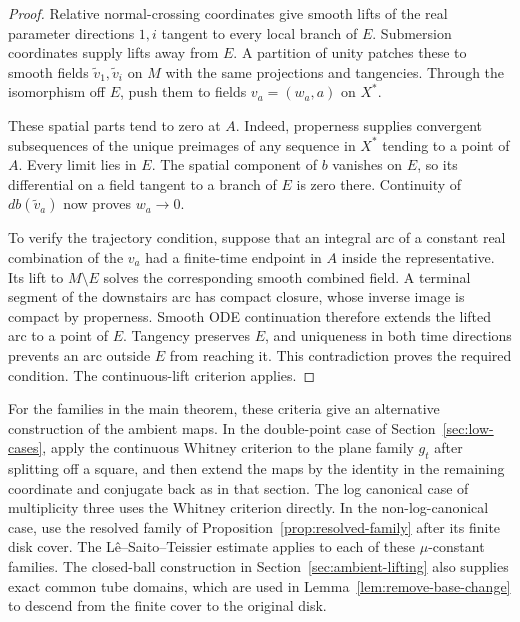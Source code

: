 \begin{proof}
Relative normal-crossing coordinates give smooth lifts of the real
parameter directions $1,i$ tangent to every local branch of $E$.
Submersion coordinates supply lifts away from $E$.  A partition of
unity patches these to smooth fields $\widetilde v_1,\widetilde v_i$
on $M$ with the same projections and tangencies.  Through the
isomorphism off $E$, push them to fields $v_a=(w_a,a)$ on $X^*$.

These spatial parts tend to zero at $A$.  Indeed, properness supplies
convergent subsequences of the unique preimages of any sequence in
$X^*$ tending to a point of $A$.  Every limit lies in $E$.  The
spatial component of $b$ vanishes on $E$, so its differential on a
field tangent to a branch of $E$ is zero there.  Continuity of
$db(\widetilde v_a)$ now proves $w_a\to0$.

To verify the trajectory condition, suppose that an integral arc of
a constant real combination of the $v_a$ had a finite-time endpoint
in $A$ inside the representative.  Its lift to $M\setminus E$
solves the corresponding smooth combined field.  A terminal segment
of the downstairs arc has compact closure, whose inverse image is
compact by properness.  Smooth ODE continuation therefore extends
the lifted arc to a point of $E$.  Tangency preserves $E$, and
uniqueness in both time directions prevents an arc outside $E$ from
reaching it.  This contradiction proves the required condition.
The continuous-lift criterion applies.
\end{proof}

For the families in the main theorem, these criteria give an alternative
construction of the ambient maps.  In the double-point case of
Section~\ref{sec:low-cases}, apply the continuous Whitney criterion to
the plane family $g_t$ after splitting off a square, and then extend
the maps by the identity in the remaining coordinate and conjugate back
as in that section.
The log canonical case of multiplicity three uses the Whitney criterion
directly.  In the non-log-canonical case, use the resolved family of
Proposition~\ref{prop:resolved-family} after its finite disk cover.
The L\^e--Saito--Teissier estimate applies to each of these
$\mu$-constant families.  The closed-ball construction in
Section~\ref{sec:ambient-lifting} also supplies exact common tube
domains, which are used in Lemma~\ref{lem:remove-base-change} to
descend from the finite cover to the original disk.
